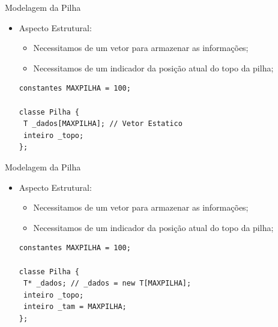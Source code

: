 \documentclass[12pt,table,xcolor={dvipsnames}]{beamer}
\begin{document}
\begin{frame}[fragile]{Modelagem da Pilha}

\begin{itemize}
\item Aspecto Estrutural:
\begin{itemize}
\item Necessitamos de um vetor para armazenar as informações;
\item Necessitamos de um indicador da posição atual do topo da pilha;
\end{itemize}
\begin{lstlisting}
constantes MAXPILHA = 100;

classe Pilha {
 T _dados[MAXPILHA]; // Vetor Estatico
 inteiro _topo;        
};
\end{lstlisting}
\end{itemize}
\end{frame}

\begin{frame}[fragile]{Modelagem da Pilha}

\begin{itemize}
\item Aspecto Estrutural:
\begin{itemize}
\item Necessitamos de um vetor para armazenar as informações;
\item Necessitamos de um indicador da posição atual do topo da pilha;
\end{itemize}
\begin{lstlisting}
constantes MAXPILHA = 100;

classe Pilha {
 T* _dados; // _dados = new T[MAXPILHA];
 inteiro _topo;
 inteiro _tam = MAXPILHA;        
};
\end{lstlisting}
\end{itemize}
\end{frame}
\end{document}
